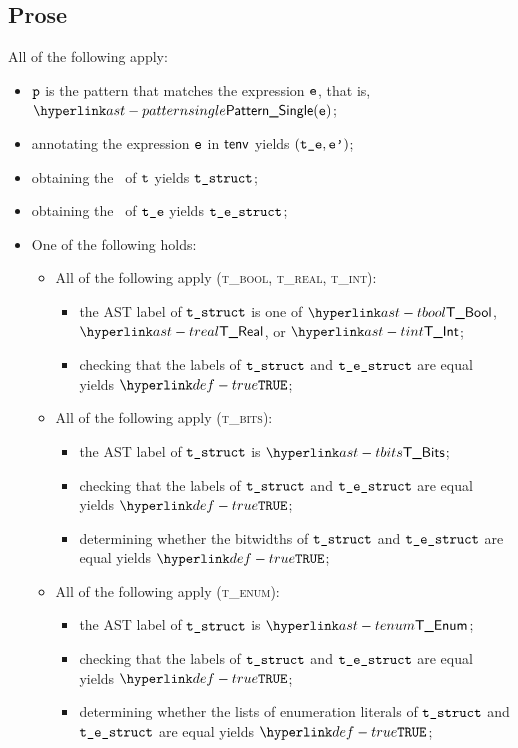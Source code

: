 \subsection{Prose}
All of the following apply:
\begin{itemize}
  \item $\texttt{p}$ is the pattern that matches the expression $\texttt{e}$, that is, $\PatternSingle(\ve)$;
  \item annotating the expression $\texttt{e}$ in $\textsf{tenv}$ yields $(\texttt{t\_e}, \texttt{e'})$\ProseOrTypeError;
  \item obtaining the \structure\ of $\texttt{t}$ yields $\texttt{t\_struct}$\ProseOrTypeError;
  \item obtaining the \structure\ of $\texttt{t\_e}$ yields $\texttt{t\_e\_struct}$\ProseOrTypeError;
  \item One of the following holds:
  \begin{itemize}
    \item All of the following apply (\textsc{t\_bool, t\_real, t\_int}):
    \begin{itemize}
      \item the AST label of $\texttt{t\_struct}$ is one of $\TBool$, $\TReal$, or $\TInt$;
      \item checking that the labels of $\texttt{t\_struct}$ and $\texttt{t\_e\_struct}$ are equal yields $\True$\ProseOrTypeError;
    \end{itemize}

    \item All of the following apply (\textsc{t\_bits}):
    \begin{itemize}
      \item the AST label of $\texttt{t\_struct}$ is $\TBits$;
      \item checking that the labels of $\texttt{t\_struct}$ and $\texttt{t\_e\_struct}$ are equal yields $\True$\ProseOrTypeError;
      \item determining whether the bitwidths of $\texttt{t\_struct}$ and $\texttt{t\_e\_struct}$ are equal yields $\True$\ProseOrTypeError;
    \end{itemize}

    \item All of the following apply (\textsc{t\_enum}):
    \begin{itemize}
      \item the AST label of $\texttt{t\_struct}$ is $\TEnum$;
      \item checking that the labels of $\texttt{t\_struct}$ and $\texttt{t\_e\_struct}$ are equal yields $\True$\ProseOrTypeError;
      \item determining whether the lists of enumeration literals of $\texttt{t\_struct}$ and $\texttt{t\_e\_struct}$ are equal yields $\True$\ProseOrTypeError;
    \end{itemize}


\end{itemize}
\end{itemize}
